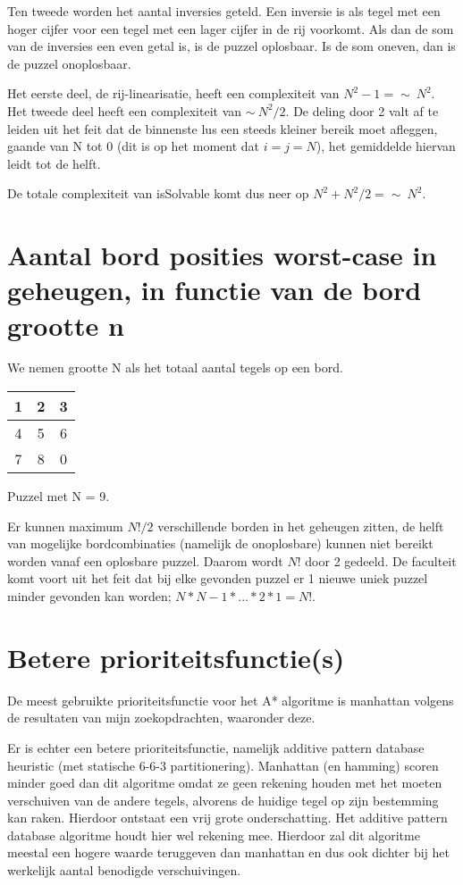 \documentclass{article}
\begin{document}
Ten tweede worden het aantal inversies geteld. Een inversie is als tegel met een hoger cijfer voor een tegel met een lager cijfer in de rij voorkomt. Als dan de som van de inversies een even getal is, is de puzzel oplosbaar. Is de som oneven, dan is de puzzel onoplosbaar.

Het eerste deel, de rij-linearisatie, heeft een complexiteit van $N^2 - 1 = \sim\ N^2 $. Het tweede deel heeft een complexiteit van $ \sim\ N^2/2$. De deling door 2 valt af te leiden uit het feit dat de binnenste lus een steeds kleiner bereik moet afleggen, gaande van N tot 0 (dit is op het moment dat $i = j = N$), het gemiddelde hiervan leidt tot de helft.

De totale complexiteit van isSolvable komt dus neer op $ N^2 + N^2/2 = \sim\ N^2 $.

\section{Aantal bord posities worst-case in geheugen, in functie van de bord grootte n}
We nemen grootte N als het totaal aantal tegels op een bord.

\begin{tabular}{| c | c | c |}
\hline
  1 & 2 & 3 \\
  \hline
  4 & 5 & 6 \\
  \hline
  7 & 8 & 0 \\
  \hline
\end{tabular}
Puzzel met N = 9.

Er kunnen maximum $N!/2$ verschillende borden in het geheugen zitten, de helft van mogelijke bordcombinaties (namelijk de onoplosbare) kunnen niet bereikt worden vanaf een oplosbare puzzel. Daarom wordt $N!$ door 2 gedeeld. De faculteit komt voort uit het feit dat bij elke gevonden puzzel er 1 nieuwe uniek puzzel minder gevonden kan worden; $ N * N-1 * ... * 2 * 1 = N!$.

\section{Betere prioriteitsfunctie(s)}
\label{APD-ref}
De meest gebruikte prioriteitsfunctie voor het A* algoritme is manhattan volgens de resultaten van mijn zoekopdrachten, waaronder deze.\cite{heuristics}


Er is echter een betere prioriteitsfunctie, namelijk additive pattern database heuristic (met statische 6-6-3 partitionering). Manhattan (en hamming) scoren minder goed dan dit algoritme omdat ze geen rekening houden met het moeten verschuiven van de andere tegels, alvorens de huidige tegel op zijn bestemming kan raken. Hierdoor ontstaat een vrij grote onderschatting. Het additive pattern database algoritme houdt hier wel rekening mee. Hierdoor zal dit algoritme meestal een hogere waarde teruggeven dan manhattan en dus ook dichter bij het werkelijk aantal benodigde verschuivingen.
\end{document}
